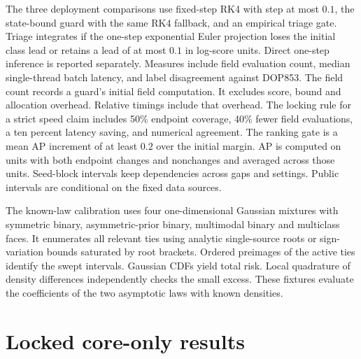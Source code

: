 \documentclass[10pt]{article}
\begin{document}
The three deployment comparisons use fixed-step RK4 with step at most $0.1$, the state-bound guard with the same RK4 fallback, and an empirical triage gate. Triage integrates if the one-step exponential Euler projection loses the initial class lead or retains a lead of at most $0.1$ in log-score units. Direct one-step inference is reported separately. Measures include field evaluation count, median single-thread batch latency, and label disagreement against DOP853. The field count records a guard's initial field computation. It excludes score, bound and allocation overhead. Relative timings include that overhead. The locking rule for a strict speed claim includes 50\% endpoint coverage, 40\% fewer field evaluations, a ten percent latency saving, and numerical agreement. The ranking gate is a mean AP increment of at least $0.2$ over the initial margin. AP is computed on units with both endpoint changes and nonchanges and averaged across those units. Seed-block intervals keep dependencies across gaps and settings. Public intervals are conditional on the fixed data sources.

The known-law calibration uses four one-dimensional Gaussian mixtures with symmetric binary, asymmetric-prior binary, multimodal binary and multiclass faces. It enumerates all relevant ties using analytic single-source roots or sign-variation bounds saturated by root brackets. Ordered preimages of the active ties identify the swept intervals. Gaussian CDFs yield total risk. Local quadrature of density differences independently checks the small excess. These fixtures evaluate the coefficients of the two asymptotic laws with known densities.

\section{Locked core-only results}
\label{sec:results}




\fi
\end{document}
